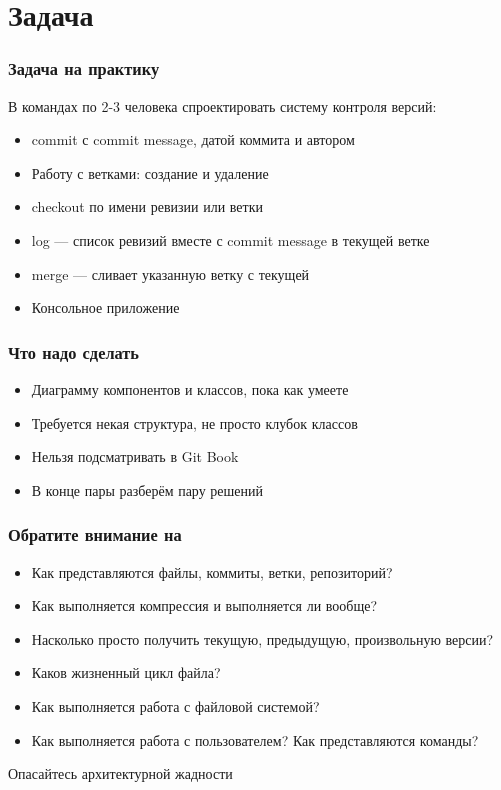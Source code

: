 \documentclass{../../slides-style}
\begin{document}
    
    \begin{frame}[plain]
        \titlepage
    \end{frame}

    \section{Задача}

    \begin{frame}
        \frametitle{Задача на практику}
        В командах по 2-3 человека спроектировать систему контроля версий:
        \begin{itemize}
            \item commit с commit message, датой коммита и автором
            \item Работу с ветками: создание и удаление
            \item checkout по имени ревизии или ветки
            \item log --- список ревизий вместе с commit message в текущей ветке
            \item merge --- сливает указанную ветку с текущей
            \item Консольное приложение
        \end{itemize}
    \end{frame}

    \begin{frame}
        \frametitle{Что надо сделать}
        \begin{itemize}
            \item Диаграмму компонентов и классов, пока как умеете
            \item Требуется некая структура, не просто клубок классов
            \item Нельзя подсматривать в Git Book
            \item В конце пары разберём пару решений
        \end{itemize}
    \end{frame}

    \begin{frame}
        \frametitle{Обратите внимание на}
        \begin{itemize}
            \item Как представляются файлы, коммиты, ветки, репозиторий?
            \item Как выполняется компрессия и выполняется ли вообще? 
            \item Насколько просто получить текущую, предыдущую, произвольную версии?
            \item Каков жизненный цикл файла?
            \item Как выполняется работа с файловой системой?
            \item Как выполняется работа с пользователем? Как представляются команды?
        \end{itemize}
        Опасайтесь архитектурной жадности
    \end{frame}
\end{document}
